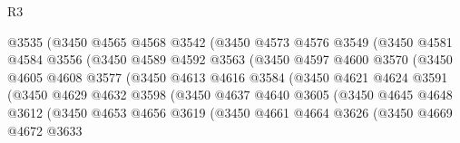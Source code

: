 \begin{lexlean}{R3}
\begin{coremodule}
                          @3535
                          (@3450
                            @4565
                            @4568
                            @3542
                            (@3450
                              @4573
                              @4576
                              @3549
                              (@3450
                                @4581
                                @4584
                                @3556
                                (@3450
                                  @4589
                                  @4592
                                  @3563
                                  (@3450
                                    @4597
                                    @4600
                                    @3570
                                    (@3450
                                      @4605
                                      @4608
                                      @3577
                                      (@3450
                                        @4613
                                        @4616
                                        @3584
                                        (@3450
                                          @4621
                                          @4624
                                          @3591
                                          (@3450
                                            @4629
                                            @4632
                                            @3598
                                            (@3450
                                              @4637
                                              @4640
                                              @3605
                                              (@3450
                                                @4645
                                                @4648
                                                @3612
                                                (@3450
                                                  @4653
                                                  @4656
                                                  @3619
                                                  (@3450
                                                    @4661
                                                    @4664
                                                    @3626
                                                    (@3450
                                                      @4669
                                                      @4672
                                                      @3633

\end{coremodule}
\end{lexlean}
